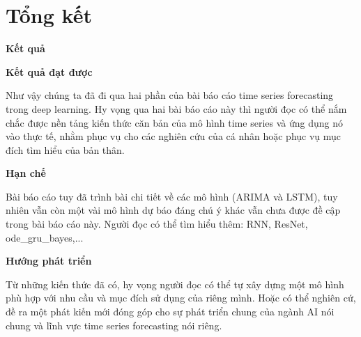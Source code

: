 \chapter{Tổng kết}

%
\bigskip


\setlength{\parindent}{0.0cm}
\textbf{\textbf{Kết quả}}

\vspace{0.5cm}
\setlength{\parindent}{0cm}
\textbf{Kết quả đạt được}

\vspace{0.5cm}


\setlength{\parindent}{0cm}
Như vậy chúng ta đã đi qua hai phần của bài báo cáo time series forecasting trong deep learning. Hy vọng qua hai bài báo cáo này thì người đọc có thể nắm chắc được nền tảng kiến thức căn bản của mô hình time series và ứng dụng nó vào thực tế, nhằm phục vụ cho các nghiên cứu của cá nhân hoặc phục vụ mục đích tìm hiểu của bản thân.

\vspace{0.5cm}
\textbf{Hạn chế}


\vspace{0.5cm}


Bài báo cáo tuy đã trình bài chi tiết về các mô hình (ARIMA và LSTM), tuy nhiên vẫn còn một vài mô hình dự báo đáng chú ý khác vẫn chưa được đề cập trong bài báo cáo này. Người đọc có thể tìm hiểu thêm: RNN, ResNet, ode\_gru\_bayes,...


\vspace{0.5cm}

\setlength{\parindent}{0.0cm}
\textbf{Hướng phát triển}



\vspace{0.5cm}


Từ những kiến thức đã có, hy vọng người đọc có thể tự xây dựng một mô hình phù hợp với nhu cầu và mục đích sử dụng của riêng mình. Hoặc có thể nghiên cứ, đề ra một phát kiến mới đóng góp cho sự phát triển chung của ngành AI nói chung và lĩnh vực time series forecasting nói riêng.

